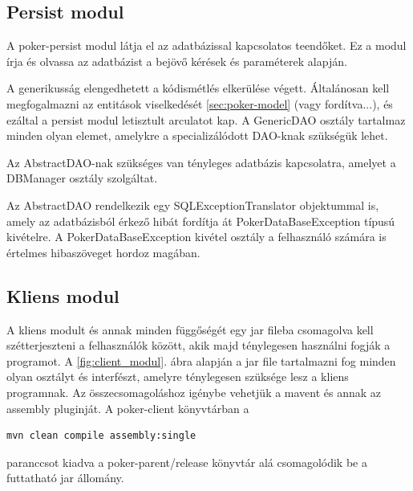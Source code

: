 \subsection{Persist modul}
A poker-persist modul látja el az adatbázissal kapcsolatos teendőket. Ez a modul írja és olvassa az adatbázist a bejövő kérések és paraméterek alapján.

A generikusság elengedhetett a kódismétlés elkerülése végett. Általánosan kell megfogalmazni az entitások viselkedését \ref{sec:poker-model} (vagy fordítva...), és ezáltal a persist modul letisztult arculatot kap. A GenericDAO osztály tartalmaz minden olyan elemet, amelykre a specializálódott DAO-knak szükségük lehet.

Az AbstractDAO-nak szükséges van tényleges adatbázis kapcsolatra, amelyet a DBManager osztály szolgáltat.

Az AbstractDAO rendelkezik egy SQLExceptionTranslator objektummal is, amely az adatbázisból érkező hibát fordítja át PokerDataBaseException típusú kivételre. A PokerDataBaseException kivétel osztály a felhasználó számára is értelmes hibaszöveget hordoz magában.

\subsection{Kliens modul}
A kliens modult és annak minden függőségét egy jar fileba csomagolva kell szétterjeszteni a felhasználók között, akik majd ténylegesen használni fogják a programot. A \ref{fig:client_modul}. ábra alapján a jar file tartalmazni fog minden olyan osztályt és interfészt, amelyre ténylegesen szüksége lesz a kliens programnak. Az összecsomagoláshoz igénybe vehetjük a mavent és annak az assembly pluginját. A poker-client könyvtárban a
 \begin{verbatim}
mvn clean compile assembly:single
\end{verbatim}
paranccsot kiadva a poker-parent/release könyvtár alá csomagolódik be a futtatható jar állomány.

